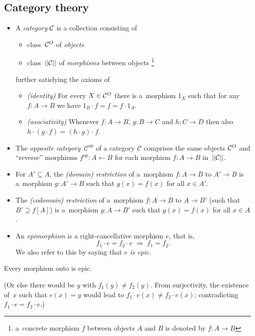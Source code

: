 \subsection*{Category theory}

\begin{itemize}
\item A \emph{category} $\mathcal{C}$ is a collection consisting of
  \begin{itemize}
  \item class~$\mathcal{C}^O$ of \emph{objects\/}
  \item class~$||\mathcal{C}||$ of \emph{morphisms\/} between objects\thinspace%
  \footnote{a~concrete morphism $f$ between objects $A$ and $B$ is denoted by
    $f\colon A \to B$}
  \end{itemize}
further satisfying the axioms of
  \begin{itemize}
  \item \emph{(identity)\/}
  For every $X\in \mathcal{C}^O$ there is a~morphism $1_X$ such that for any $f\colon
  A \to B$ we have $1_B \cdot f = f = f \cdot 1_A$.
  \item \emph{(asociativity)\/}
  Whenever $f\colon A \to B$, $g\colon B \to C$ and $h\colon C \to D$ then also $h
  \cdot (g \cdot f) = (h \cdot g) \cdot f$.
  \end{itemize}

\item The \emph{opposite category}~$\mathcal{C}^{op}$ of a category
$\mathcal{C}$ comprises the same objects $\mathcal{C}^O$ and ``reverse'' morphisms
$f^{op}\colon A \leftarrow B$ for each morphism $f\colon A \to B$
in~$||\mathcal{C}||$.

\item For $A' \subseteq A$, the \emph{(domain) restriction} of a~morphism $f\colon A \to
B$ to $A' \to B$ is a~morphism $g \colon A' \to B$ such that $g(x) = f(x)$ for
all $x\in A'$.

\item The \emph{(codomain) restriction} of a~morphism $f\colon A \to B$ to $A
\to B'$ (such that $B' \supseteq f[A]$) is a~morphism $g \colon A \to B'$ such
that $g(x) = f(x)$ for all $x\in A$.

\item An \emph{epimorphism} is a right-cancellative morphism $e$, that is,
\[
  f_1 \cdot e = f_2 \cdot e \; \Longrightarrow \; f_1 = f_2.
\]
We also refer to this by saying that \emph{$e$ is epic\/}.
\end{itemize}

\begin{fact} \label{fct:onto->epic}
  Every morphism onto is epic.
\end{fact}
(Or else there would be $y$ with $f_1(y) \ne f_2(y)$.
 From surjectivity, the existence of~$x$ such that $e(x) = y$ would lead to
 $f_1 \cdot e(x) \ne f_2 \cdot e(x)$; contradicting $f_1 \cdot e = f_2 \cdot
 e$.)

